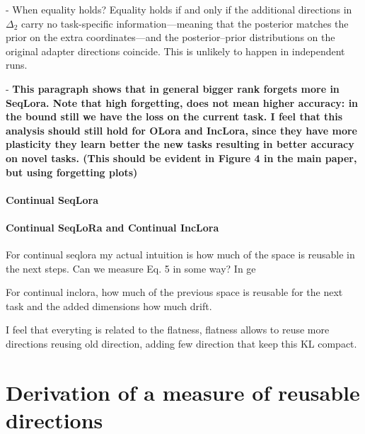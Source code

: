 \documentclass{article}
\theoremstyle{plain}
\theoremstyle{definition}
\theoremstyle{remark}
\begin{document}
- When equality holds? Equality holds if and only if the additional directions in $\Delta_2$ carry no task-specific information—meaning that the posterior matches the prior on the extra coordinates—and the posterior–prior distributions on the original adapter directions coincide. This is unlikely to happen in independent runs. 

- \textbf{This paragraph shows that in general bigger rank forgets more in SeqLora. Note that high forgetting, does not mean higher accuracy: in the bound still we have the loss on the current task. I feel that this analysis should still hold for OLora and IncLora, since they have more plasticity they learn better the new tasks resulting in better accuracy on novel tasks. (This should be evident in Figure 4 in the main paper, but using forgetting plots)}


\paragraph{Continual SeqLora}

\paragraph{Continual SeqLoRa and Continual IncLora}

For continual seqlora my actual intuition is how much of the space is reusable in the next steps. Can we measure Eq. 5 in some way? In ge 




For continual inclora, how much of the previous space is reusable for the next task and the added dimensions how much drift. 

I feel that everyting is related to the flatness, flatness allows to reuse more directions reusing old direction, adding few direction that keep this KL compact. 

 
 
\section{Derivation of a measure of reusable directions}
 
 

 


 

 
 
\end{document}
